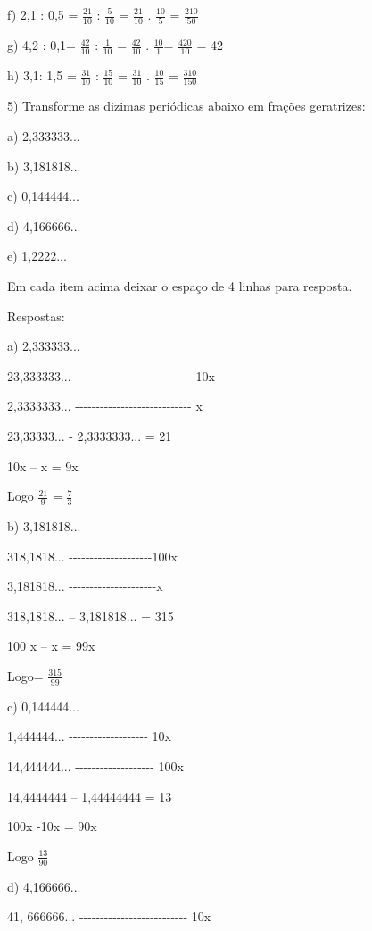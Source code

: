 f) 2,1 : 0,5 = \(\frac{21}{10}\) : \(\frac{5}{10}\) = \(\frac{21}{10}\)
. \(\frac{10}{5}\) = \(\frac{210}{50}\)

g) 4,2 : 0,1= \(\frac{42}{10}\) : \(\frac{1}{10}\) = \(\frac{42}{10}\) .
\(\frac{10}{1}\)= \(\frac{420}{10}\) = 42

h) 3,1: 1,5 = \(\frac{31}{10}\) : \(\frac{15}{10}\) = \(\frac{31}{10}\)
. \(\frac{10}{15}\) = \(\frac{310}{150}\)

5) Transforme as dizimas periódicas abaixo em frações geratrizes:

a) 2,333333...

b) 3,181818...

c) 0,144444...

d) 4,166666...

e) 1,2222...

Em cada item acima deixar o espaço de 4 linhas para resposta.

Respostas:

a) 2,333333...

23,333333...
-\/-\/-\/-\/-\/-\/-\/-\/-\/-\/-\/-\/-\/-\/-\/-\/-\/-\/-\/-\/-\/-\/-\/-\/-\/-\/-\/-
10x

2,3333333...
-\/-\/-\/-\/-\/-\/-\/-\/-\/-\/-\/-\/-\/-\/-\/-\/-\/-\/-\/-\/-\/-\/-\/-\/-\/-\/-\/-
x

23,33333... - 2,3333333... = 21

10x -- x = 9x

Logo \(\frac{21}{9}\) = \(\frac{7}{3}\)

b) 3,181818...

318,1818...
-\/-\/-\/-\/-\/-\/-\/-\/-\/-\/-\/-\/-\/-\/-\/-\/-\/-\/-\/-100x

3,181818...
-\/-\/-\/-\/-\/-\/-\/-\/-\/-\/-\/-\/-\/-\/-\/-\/-\/-\/-\/-\/-x

318,1818... -- 3,181818... = 315

100 x -- x = 99x

Logo= \(\frac{315}{99}\)

c) 0,144444...

1,444444... -\/-\/-\/-\/-\/-\/-\/-\/-\/-\/-\/-\/-\/-\/-\/-\/-\/-\/- 10x

14,444444... -\/-\/-\/-\/-\/-\/-\/-\/-\/-\/-\/-\/-\/-\/-\/-\/-\/-\/-
100x

14,4444444 -- 1,44444444 = 13

100x -10x = 90x

Logo \(\frac{13}{90}\)

d) 4,166666...

41, 666666...
-\/-\/-\/-\/-\/-\/-\/-\/-\/-\/-\/-\/-\/-\/-\/-\/-\/-\/-\/-\/-\/-\/-\/-\/-\/-
10x

